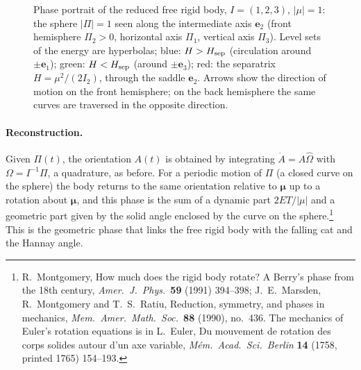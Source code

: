 \begin{figure}[ht]

\caption{Phase portrait of the reduced free rigid body, $I=(1,2,3)$, $|\mu|=1$: the sphere $|\Pi|=1$ seen along the intermediate axis $\mathbf e_2$ (front hemisphere $\Pi_2>0$, horizontal axis $\Pi_1$, vertical axis $\Pi_3$). Level sets of the energy are hyperbolas; blue: $H>H_{\rm sep}$ (circulation around $\pm\mathbf e_1$); green: $H<H_{\rm sep}$ (around $\pm\mathbf e_3$); red: the separatrix $H=\mu^2/(2I_2)$, through the saddle $\mathbf e_2$. Arrows show the direction of motion on the front hemisphere; on the back hemisphere the same curves are traversed in the opposite direction.}\label{rd:fig:polhode}
\end{figure}

\paragraph{Reconstruction.} Given $\Pi(t)$, the orientation $A(t)$ is obtained by integrating $\dot A=A\hat\Omega$ with $\Omega=I^{-1}\Pi$, a quadrature, as before. For a periodic motion of $\Pi$ (a closed curve on the sphere) the body returns to the same orientation relative to $\boldsymbol\mu$ up to a rotation about $\boldsymbol\mu$, and this phase is the sum of a dynamic part $2ET/|\mu|$ and a geometric part given by the solid angle enclosed by the curve on the sphere.\footnote{R.\ Montgomery, How much does the rigid body rotate? A Berry's phase from the 18th century, \emph{Amer.\ J.\ Phys.}\ \textbf{59} (1991) 394--398; J.\ E.\ Marsden, R.\ Montgomery and T.\ S.\ Ratiu, Reduction, symmetry, and phases in mechanics, \emph{Mem.\ Amer.\ Math.\ Soc.}\ \textbf{88} (1990), no.~436. The mechanics of Euler's rotation equations is in L.\ Euler, Du mouvement de rotation des corps solides autour d'un axe variable, \emph{M\'em.\ Acad.\ Sci.\ Berlin} \textbf{14} (1758, printed 1765) 154--193.} This is the geometric phase that links the free rigid body with the falling cat and the Hannay angle.

